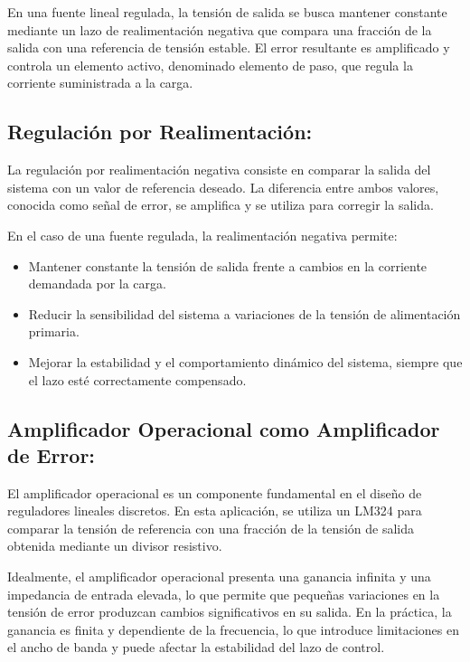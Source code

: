 \documentclass[12pt,a4paper]{article}
\begin{document}
En una fuente lineal regulada, la tensión de salida se busca mantener constante mediante un lazo de realimentación negativa que compara una fracción de la salida con una referencia de tensión estable. El error resultante es amplificado y controla un elemento activo, denominado elemento de paso, que regula la corriente suministrada a la carga.
\\

\subsection{Regulación por Realimentación:}

La regulación por realimentación negativa consiste en comparar la salida del sistema con un valor de referencia deseado. La diferencia entre ambos valores, conocida como señal de error, se amplifica y se utiliza para corregir la salida.

En el caso de una fuente regulada, la realimentación negativa permite:
\begin{itemize}
    \item Mantener constante la tensión de salida frente a cambios en la corriente demandada por la carga.
    \item Reducir la sensibilidad del sistema a variaciones de la tensión de alimentación primaria.
    \item Mejorar la estabilidad y el comportamiento dinámico del sistema, siempre que el lazo esté correctamente compensado.
\end{itemize}
\hspace{0.5 cm}

\subsection{Amplificador Operacional como Amplificador de Error:}

El amplificador operacional es un componente fundamental en el diseño de reguladores lineales discretos. En esta aplicación, se utiliza un LM324 para comparar la tensión de referencia con una fracción de la tensión de salida obtenida mediante un divisor resistivo.

Idealmente, el amplificador operacional presenta una ganancia infinita y una impedancia de entrada elevada, lo que permite que pequeñas variaciones en la tensión de error produzcan cambios significativos en su salida. En la práctica, la ganancia es finita y dependiente de la frecuencia, lo que introduce limitaciones en el ancho de banda y puede afectar la estabilidad del lazo de control.
\\
\end{document}
